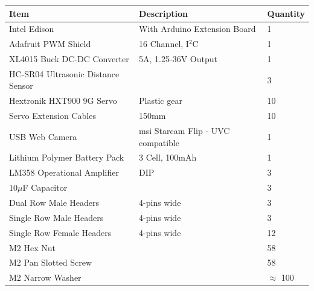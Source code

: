     \begin{table}[H]
    \centering
    \begin{tabular}{@{}lll@{}}
    \toprule
    Item                               & Description                                     & Quantity      \\ \midrule
    Intel Edison                       & With Arduino Extension Board                    & 1             \\
    Adafruit PWM Shield                & 16 Channel, I$^2$C                              & 1             \\
    XL4015 Buck DC-DC Converter        & 5A, 1.25-36V Output                             & 1             \\
    HC-SR04 Ultrasonic Distance Sensor &                                                 & 3             \\
    Hextronik HXT900 9G Servo          & Plastic gear                                    & 10            \\
    Servo Extension Cables             & 150mm                                           & 10            \\
    USB Web Camera                     & msi Starcam Flip - UVC compatible               & 1             \\
    Lithium Polymer Battery Pack       & 3 Cell, 100mAh                                  & 1             \\
    LM358 Operational Amplifier        & DIP                                             & 3             \\
    10$\mu$F Capacitor                 &                                                 & 3             \\
    Dual Row Male Headers              & 4-pins wide                                     & 3             \\
    Single Row Male Headers            & 4-pins wide                                     & 3             \\
    Single Row Female Headers          & 4-pins wide                                     & 12            \\
    M2 Hex Nut                         &                                                 & 58            \\
    M2 Pan Slotted Screw               &                                                 & 58            \\
    M2 Narrow Washer                   &                                                 & $\approx$ 100 \\

\end{tabular}
\end{table}
